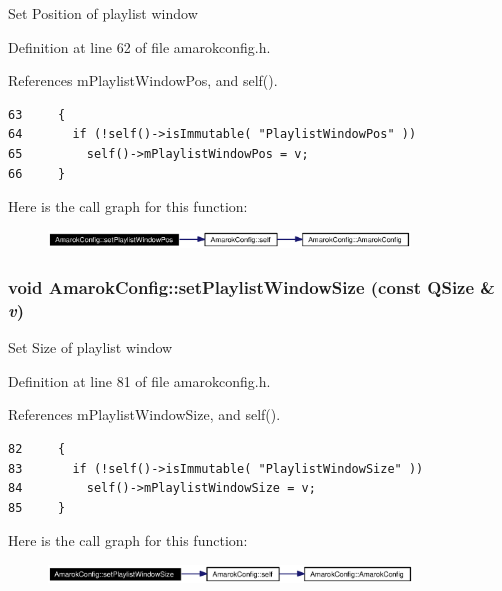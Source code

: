 Set Position of playlist window 

Definition at line 62 of file amarokconfig.h.

References m\-Playlist\-Window\-Pos, and self().



\footnotesize\begin{verbatim}63     {
64       if (!self()->isImmutable( "PlaylistWindowPos" ))
65         self()->mPlaylistWindowPos = v;
66     }
\end{verbatim}\normalsize 


Here is the call graph for this function:\begin{figure}[H]
\begin{center}
\leavevmode
\includegraphics[width=272pt]{classAmarokConfig_AmarokConfige5_cgraph}
\end{center}
\end{figure}
\subsubsection{\setlength{\rightskip}{0pt plus 5cm}void Amarok\-Config::set\-Playlist\-Window\-Size (const QSize \& {\em v})\hspace{0.3cm}{\tt  [inline, static]}}\label{classAmarokConfig_AmarokConfige7}


Set Size of playlist window 

Definition at line 81 of file amarokconfig.h.

References m\-Playlist\-Window\-Size, and self().



\footnotesize\begin{verbatim}82     {
83       if (!self()->isImmutable( "PlaylistWindowSize" ))
84         self()->mPlaylistWindowSize = v;
85     }
\end{verbatim}\normalsize 


Here is the call graph for this function:\begin{figure}[H]
\begin{center}
\leavevmode
\includegraphics[width=274pt]{classAmarokConfig_AmarokConfige7_cgraph}
\end{center}
\end{figure}

